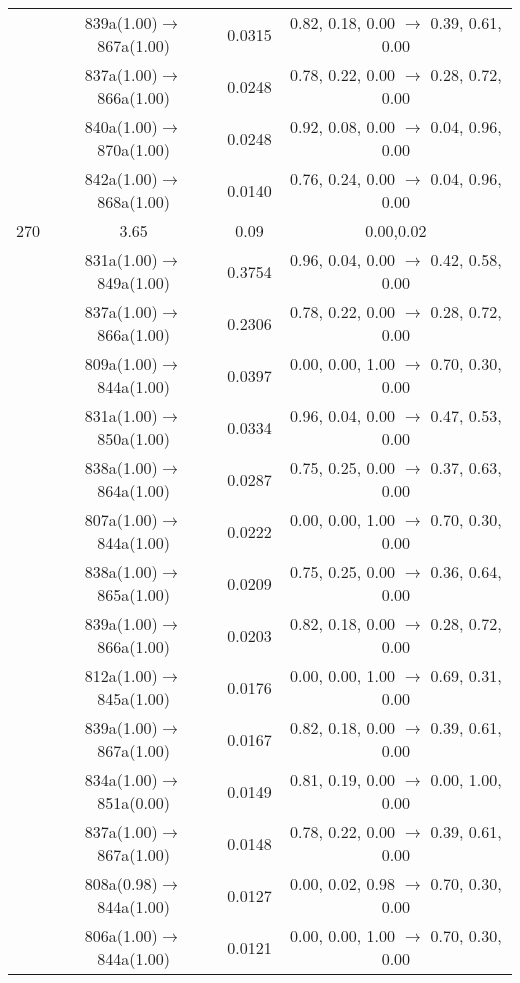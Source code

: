 \documentclass[10pt,a4paper]{article}
\begin{document}
\begin{longtable}{c|c|c|c}
 	& 839a(1.00)$\rightarrow$867a(1.00) &	 0.0315 &	 0.82, 0.18, 0.00 $\rightarrow$ 0.39, 0.61, 0.00 \\ 
 	& 837a(1.00)$\rightarrow$866a(1.00) &	 0.0248 &	 0.78, 0.22, 0.00 $\rightarrow$ 0.28, 0.72, 0.00 \\ 
 	& 840a(1.00)$\rightarrow$870a(1.00) &	 0.0248 &	 0.92, 0.08, 0.00 $\rightarrow$ 0.04, 0.96, 0.00 \\ 
 	& 842a(1.00)$\rightarrow$868a(1.00) &	 0.0140 &	 0.76, 0.24, 0.00 $\rightarrow$ 0.04, 0.96, 0.00 \\ 
 \hline270 &	 3.65 &	 0.09 &	 0.00,0.02 \\ 
  	& 831a(1.00)$\rightarrow$849a(1.00) &	 0.3754 &	 0.96, 0.04, 0.00 $\rightarrow$ 0.42, 0.58, 0.00 \\ 
 	& 837a(1.00)$\rightarrow$866a(1.00) &	 0.2306 &	 0.78, 0.22, 0.00 $\rightarrow$ 0.28, 0.72, 0.00 \\ 
 	& 809a(1.00)$\rightarrow$844a(1.00) &	 0.0397 &	 0.00, 0.00, 1.00 $\rightarrow$ 0.70, 0.30, 0.00 \\ 
 	& 831a(1.00)$\rightarrow$850a(1.00) &	 0.0334 &	 0.96, 0.04, 0.00 $\rightarrow$ 0.47, 0.53, 0.00 \\ 
 	& 838a(1.00)$\rightarrow$864a(1.00) &	 0.0287 &	 0.75, 0.25, 0.00 $\rightarrow$ 0.37, 0.63, 0.00 \\ 
 	& 807a(1.00)$\rightarrow$844a(1.00) &	 0.0222 &	 0.00, 0.00, 1.00 $\rightarrow$ 0.70, 0.30, 0.00 \\ 
 	& 838a(1.00)$\rightarrow$865a(1.00) &	 0.0209 &	 0.75, 0.25, 0.00 $\rightarrow$ 0.36, 0.64, 0.00 \\ 
 	& 839a(1.00)$\rightarrow$866a(1.00) &	 0.0203 &	 0.82, 0.18, 0.00 $\rightarrow$ 0.28, 0.72, 0.00 \\ 
 	& 812a(1.00)$\rightarrow$845a(1.00) &	 0.0176 &	 0.00, 0.00, 1.00 $\rightarrow$ 0.69, 0.31, 0.00 \\ 
 	& 839a(1.00)$\rightarrow$867a(1.00) &	 0.0167 &	 0.82, 0.18, 0.00 $\rightarrow$ 0.39, 0.61, 0.00 \\ 
 	& 834a(1.00)$\rightarrow$851a(0.00) &	 0.0149 &	 0.81, 0.19, 0.00 $\rightarrow$ 0.00, 1.00, 0.00 \\ 
 	& 837a(1.00)$\rightarrow$867a(1.00) &	 0.0148 &	 0.78, 0.22, 0.00 $\rightarrow$ 0.39, 0.61, 0.00 \\ 
 	& 808a(0.98)$\rightarrow$844a(1.00) &	 0.0127 &	 0.00, 0.02, 0.98 $\rightarrow$ 0.70, 0.30, 0.00 \\ 
 	& 806a(1.00)$\rightarrow$844a(1.00) &	 0.0121 &	 0.00, 0.00, 1.00 $\rightarrow$ 0.70, 0.30, 0.00 \\ 

\end{longtable}
\end{document}
